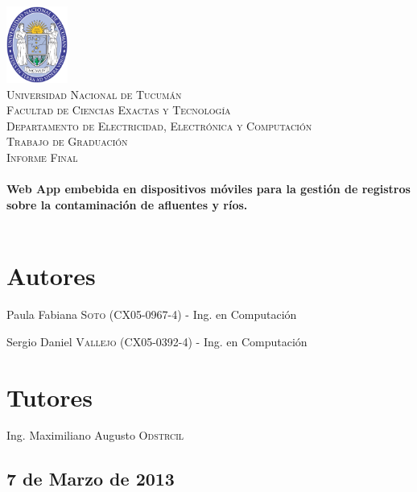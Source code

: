 \begin{titlepage}
 
\begin{center}
 
 
\includegraphics[width=0.15\textwidth]{imagenes/logo-unt.png}\\[0.5cm]
 
\textsc{\LARGE Universidad Nacional de Tucumán}\\[0.5cm]

\textsc{\normalsize Facultad de Ciencias Exactas y Tecnología}\\[0.5cm]

\textsc{\small Departamento de Electricidad, Electrónica y Computación}\\[1cm]
 
\textsc{\Large Trabajo de Graduación}\\[0.2cm]

\textsc{\normalsize Informe Final}\\[0.5cm]
 
 
\HRule \\[0.4cm]
{ \LARGE \bfseries Web App embebida en dispositivos móviles para la gestión de registros sobre la contaminación de afluentes y ríos.
}\\[0.4cm]
\HRule \\[0.4cm]
 
\end{center} 

\section*{Autores}
Paula Fabiana \textsc{Soto} (CX05-0967-4) - Ing. en Computación

Sergio Daniel \textsc{Vallejo} (CX05-0392-4) - Ing. en Computación

\section*{Tutores}
Ing. Maximiliano Augusto \textsc{Odstrcil}

\begin{center}
\subsection*{7 de Marzo de 2013}
\end{center}

\end{titlepage}